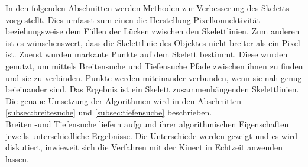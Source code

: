 In den folgenden Abschnitten werden Methoden zur Verbesserung des Skeletts vorgestellt. Dies umfasst zum einen die Herstellung Pixelkonnektivität beziehungsweise dem Füllen der Lücken zwischen den Skelettlinien. Zum anderen ist es wünschenswert, dass die Skelettlinie des Objektes nicht breiter als ein Pixel ist. Zuerst wurden markante Punkte auf dem Skelett bestimmt. Diese wurden
genutzt, um mittels Breitensuche und Tiefensuche Pfade zwischen ihnen zu finden und sie zu verbinden. Punkte werden miteinander
verbunden, wenn sie nah genug beieinander sind. Das Ergebnis ist ein Skelett
zusammenhängenden Skelettlinien. Die genaue Umsetzung der Algorithmen wird in den Abschnitten \ref{subsec:breitesuche} und \ref{subsec:tiefensuche} beschrieben.\\
Breiten -und Tiefensuche liefern aufgrund ihrer algorithmischen Eigenschaften jeweils unterschiedliche Ergebnisse. Die Unterschiede werden gezeigt und es wird diskutiert, inwieweit sich die Verfahren mit der Kinect in Echtzeit anwenden lassen. 
\newpage
